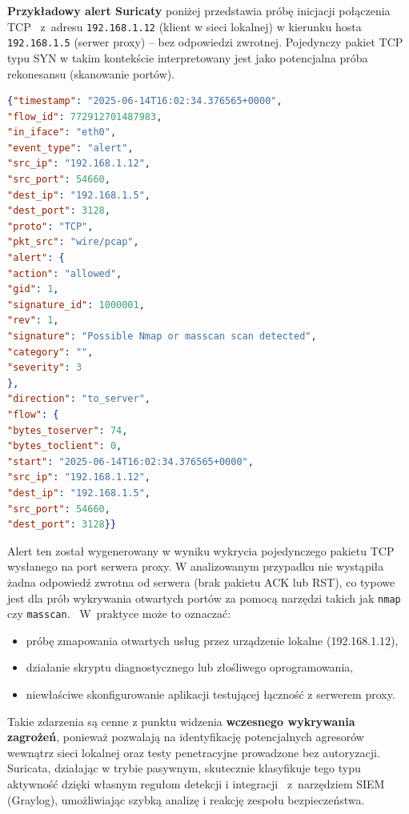 \documentclass[
    left=2.5cm,         %
    right=2.5cm,        %
    top=2.5cm,          %
    bottom=3cm,         %
    bindingoffset=6mm,  %
    nohyphenation=true %
]{eiti/eiti-thesis} %
\begin{document}
\textbf{Przykładowy alert Suricaty} poniżej przedstawia próbę inicjacji połączenia TCP ~z~adresu \texttt{192.168.1.12} (klient w sieci lokalnej) w kierunku hosta \texttt{192.168.1.5} (serwer proxy) – bez odpowiedzi zwrotnej. Pojedynczy pakiet TCP typu SYN w takim kontekście interpretowany jest jako potencjalna próba rekonesansu (skanowanie portów).

\begin{lstlisting}[language=json, caption={Alert Suricaty typu \texttt{Possible Nmap or masscan scan detected} na porcie \texttt{3128/TCP}}, label={lst:suricata-proxy-alert}]
{"timestamp": "2025-06-14T16:02:34.376565+0000",
"flow_id": 772912701487983,
"in_iface": "eth0",
"event_type": "alert",
"src_ip": "192.168.1.12",
"src_port": 54660,
"dest_ip": "192.168.1.5",
"dest_port": 3128,
"proto": "TCP",
"pkt_src": "wire/pcap",
"alert": {
"action": "allowed",
"gid": 1,
"signature_id": 1000001,
"rev": 1,
"signature": "Possible Nmap or masscan scan detected",
"category": "",
"severity": 3
},
"direction": "to_server",
"flow": {
"bytes_toserver": 74,
"bytes_toclient": 0,
"start": "2025-06-14T16:02:34.376565+0000",
"src_ip": "192.168.1.12",
"dest_ip": "192.168.1.5",
"src_port": 54660,
"dest_port": 3128}}
\end{lstlisting}

Alert ten został wygenerowany w wyniku wykrycia pojedynczego pakietu TCP wysłanego na port serwera proxy. W analizowanym przypadku nie wystąpiła żadna odpowiedź zwrotna od serwera (brak pakietu ACK lub RST), co typowe jest dla prób wykrywania otwartych portów za pomocą narzędzi takich jak \texttt{nmap} czy \texttt{masscan}. 
~W~praktyce może to oznaczać:
\begin{itemize}
\item próbę zmapowania otwartych usług przez urządzenie lokalne (192.168.1.12),
\item działanie skryptu diagnostycznego lub złośliwego oprogramowania,
\item niewłaściwe skonfigurowanie aplikacji testującej łączność z serwerem proxy.
\end{itemize}

Takie zdarzenia są cenne z punktu widzenia \textbf{wczesnego wykrywania zagrożeń}, ponieważ pozwalają na identyfikację potencjalnych agresorów wewnątrz sieci lokalnej oraz testy penetracyjne prowadzone bez autoryzacji. Suricata, działając w trybie pasywnym, skutecznie klasyfikuje tego typu aktywność dzięki własnym regułom detekcji i integracji ~z~narzędziem SIEM (Graylog), umożliwiając szybką analizę i reakcję zespołu bezpieczeństwa.
\end{document}
